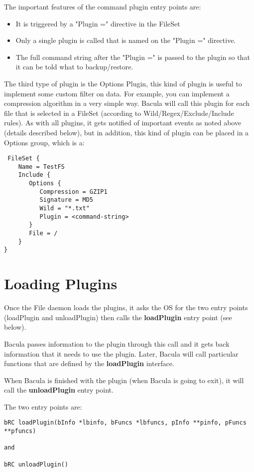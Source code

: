 The important features of the command plugin entry points are:
\begin{itemize}
 \item It is triggered by a "Plugin =" directive in the FileSet
 \item Only a single plugin is called that is named on the "Plugin =" directive.
 \item The full command string after the "Plugin =" is passed to the plugin
    so that it can be told what to backup/restore.
\end{itemize}

The third type of plugin is the Options Plugin, this kind of plugin is useful
to implement some custom filter on data. For example, you can implement a
compression algorithm in a very simple way. Bacula will call this plugin for
each file that is selected in a FileSet (according to
Wild/Regex/Exclude/Include rules). As with all plugins, it gets notified of
important events as noted above (details described below), but in addition,
this kind of plugin can be placed in a Options group, which is a:

\begin{verbatim}
 FileSet {
    Name = TestFS
    Include {
       Options {
          Compression = GZIP1
          Signature = MD5
          Wild = "*.txt"
          Plugin = <command-string>
       }
       File = /
    }
}
\end{verbatim}

\section{Loading Plugins}
Once the File daemon loads the plugins, it asks the OS for the
two entry points (loadPlugin and unloadPlugin) then calls the
{\bf loadPlugin} entry point (see below).

Bacula passes information to the plugin through this call and it gets
back information that it needs to use the plugin.  Later, Bacula
 will call particular functions that are defined by the
{\bf loadPlugin} interface.  

When Bacula is finished with the plugin 
(when Bacula is going to exit), it will call the {\bf unloadPlugin}
entry point.

The two entry points are:

\begin{verbatim}
bRC loadPlugin(bInfo *lbinfo, bFuncs *lbfuncs, pInfo **pinfo, pFuncs **pfuncs)

and

bRC unloadPlugin()
\end{verbatim}

